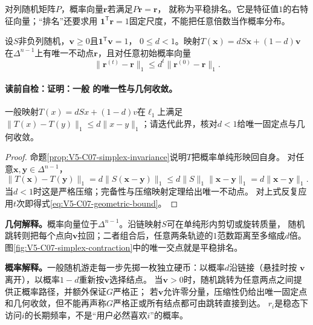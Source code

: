 \begin{definition}[平稳排名与主特征向量]\label{def:V5-C07-stationary-pr}
对列随机矩阵$P$，概率向量$\boldsymbol r$若满足$P\boldsymbol r=\boldsymbol r$，
就称为平稳排名。它是特征值$1$的右特征向量；“排名”还要求用
$\boldsymbol1^{\mathsf T}\boldsymbol r=1$固定尺度，不能把任意倍数当作概率分布。
\end{definition}

\begin{theorem}\label{thm:V5-C07-contraction}
设$S$非负列随机，$\boldsymbol v\ge0$且$\boldsymbol1^{\mathsf T}\boldsymbol v=1$，
$0\le d<1$。映射$T(\boldsymbol x)=dS\boldsymbol x+(1-d)\boldsymbol v$
在$\Delta^{n-1}$上有唯一不动点$\boldsymbol r$，且对任意初始概率向量
\begin{equation}
\|\boldsymbol r^{(t)}-\boldsymbol r\|_1
\le d^t\|\boldsymbol r^{(0)}-\boldsymbol r\|_1.
\label{eq:V5-C07-geometric-bound}
\end{equation}
\end{theorem}
\paragraph{读前自检：证明：一般 的唯一性与几何收敛。}一般\PageRank{}映射$T(x)=dSx+(1-d)v$在$\ell_1$上满足$\lVert T(x)-T(y)\rVert_1\le d\lVert x-y\rVert_1$；请迭代此界，核对$d<1$给唯一固定点与几何收敛。\par

\begin{proof}
命题\ref{prop:V5-C07-simplex-invariance}说明$T$把概率单纯形映回自身。
对任意$\boldsymbol x,\boldsymbol y\in\Delta^{n-1}$，
\[
\|T(\boldsymbol x)-T(\boldsymbol y)\|_1
=d\|S(\boldsymbol x-\boldsymbol y)\|_1
\le d\|S\|_1\|\boldsymbol x-\boldsymbol y\|_1
=d\|\boldsymbol x-\boldsymbol y\|_1.
\]
当$d<1$时这是严格压缩；完备性与压缩映射定理给出唯一不动点。
对上式反复应用$t$次即得式\eqref{eq:V5-C07-geometric-bound}。
\end{proof}

\label{struct:V5-C07-CH14}
\textbf{几何解释。}概率向量位于$\Delta^{n-1}$。沿链映射$S$可在单纯形内剪切或旋转质量，
随机跳转则把每个点向$\boldsymbol v$拉回；二者组合后，任意两条轨迹的$1$范数距离至多缩成$d$倍。
图\ref{fig:V5-C07-simplex-contraction}中的唯一交点就是平稳排名。


\label{struct:V5-C07-CH15}
\textbf{概率解释。}一般随机游走每一步先掷一枚独立硬币：以概率$d$沿链接（悬挂时按
$\boldsymbol v$离开），以概率$1-d$重新按$\boldsymbol v$选择结点。
当$\boldsymbol v>0$时，随机跳转为任意两点之间提供正概率路径，并额外保证$G$严格正；
若$\boldsymbol v$允许零分量，压缩性仍给出唯一固定点和几何收敛，但不能再声称$G$严格正或所有结点都可由跳转直接到达。
$r_i$是稳态下访问$i$的长期频率，不是“用户必然喜欢$i$”的概率。

